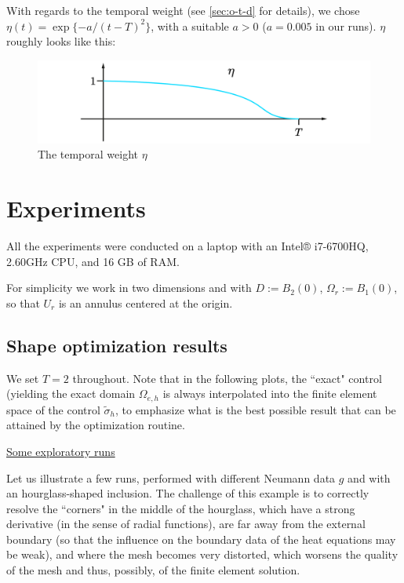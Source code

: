 \documentclass[english,a4paper,9pt,oneside]{scrbook}	%
\theoremstyle{break}
\theoremstyle{remark}
\begin{document}
With regards to the temporal weight (see \cref{sec:o-t-d} for details), we chose $\eta(t) = \exp\{-a/(t-T)^2\}$, with a suitable $a>0$ ($a=0.005$ in our runs). $\eta$ roughly looks like this:

\begin{figure}[H]
\centering
\includegraphics[width=0.5\columnwidth]{Images/Eta.pdf}
\caption{The temporal weight $\eta$}\label{fig:eta}
\end{figure}

\section{Experiments}
\label{sec:experiments}

All the experiments were conducted on a laptop with an Intel® i7-6700HQ, 2.60GHz CPU, and 16 GB of RAM.

For simplicity we work in two dimensions and with $D:=B_2(0)$, $\Omega_r := B_{1}(0)$, so that $U_r$ is an annulus centered at the origin. 

\subsection{Shape optimization results}

We set $T=2$ throughout. Note that in the following plots, the ``exact" control (yielding the exact domain $\Omega_{e,h}$ is always interpolated into the finite element space of the control $\tilde{\sigma}_h$, to emphasize what is the best possible result that can be attained by the optimization routine.
%

\underline{Some exploratory runs}

Let us illustrate a few runs, performed with different Neumann data $g$ and with an hourglass-shaped inclusion. The challenge of this example is to correctly resolve the ``corners" in the middle of the hourglass, which have a strong derivative (in the sense of radial functions), are far away from the external boundary (so that the influence on the boundary data of the heat equations may be weak), and where the mesh becomes very distorted, which worsens the quality of the mesh and thus, possibly, of the finite element solution.
\end{document}
